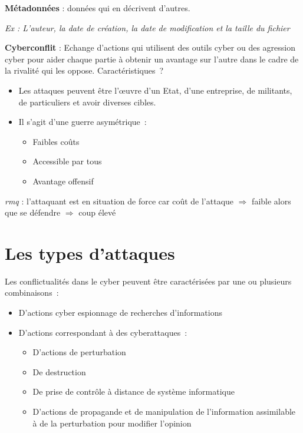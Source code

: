 \documentclass[a4paper,11pt]{report}
\begin{document}
\textbf{Métadonnées} :  données qui en décrivent d’autres.

\textit{Ex : L’auteur, la date de création, la date de modification et la taille du fichier}

\textbf{Cyberconflit} : Echange d’actions qui utilisent des outils cyber ou des agression cyber pour aider chaque partie à obtenir un avantage sur l’autre dans le cadre de la rivalité qui les oppose.
Caractéristiques ?
\begin{itemize}
    \item Les attaques peuvent être l’œuvre d’un Etat, d’une entreprise, de militants, de particuliers et avoir diverses cibles.
    \item Il s’agit d’une guerre asymétrique :
    \begin{itemize}
        \item Faibles coûts
        \item Accessible par tous
        \item Avantage offensif
    \end{itemize}
\end{itemize}

\textit{rmq} : l’attaquant est en situation de force car coût de l’attaque $\Rightarrow$ faible alors que se défendre $\Rightarrow$ coup élevé

\section{Les types d'attaques}

Les conflictualités dans le cyber peuvent être caractérisées par une ou plusieurs combinaisons :
\begin{itemize}
    \item D’actions cyber espionnage de recherches d’informations \\
    \item D'actions correspondant à des cyberattaques :
    \begin{itemize}
        \item D’actions de perturbation \\
        \item De destruction\\
        \item De prise de contrôle à distance de système informatique\\
        \item D’actions de propagande et de manipulation de l’information assimilable à de la perturbation pour modifier l’opinion\\
    \end{itemize}
\end{itemize}
\end{document}
